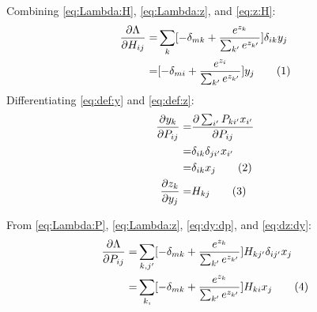 \documentclass[]{article}
\newcommand\numberthis{\addtocounter{equation}{1}\tag{\theequation}}
\begin{document}
Combining \eqref{eq:Lambda:H}, \eqref{eq:Lambda:z}, and \eqref{eq:z:H}:
\begin{align*}
	\frac{\partial{\Lambda}}{\partial H_{ij}} =& \sum_k  [-\delta_{mk} + \frac{e^{z_k}}{\sum_{k^{\prime}} e^{z_{k^{\prime}}}} ] \delta_{ik} y_j\\
	=& [-\delta_{mi} + \frac{e^{z_i}}{\sum_{k^{\prime}} e^{z_{k^{\prime}}}} ]  y_j   \numberthis \label{eq:Lambda:HH}
\end{align*}
Differentiating \eqref{eq:def:y} and \eqref{eq:def:z}:
\begin{align*}
	\frac{\partial y_k}{\partial P_{ij}} =&\frac{\partial \sum_{i^{\prime}} P_{k{i^{\prime}}} x_{i^{\prime}}}{\partial P_{ij}}\\
	=& \delta_{ik} \delta_{j{i^{\prime}}} x_{{i^{\prime}}}\\
	=& \delta_{ik} x_j \numberthis \label{eq:dy:dp}\\
	\frac{\partial z_k}{\partial y_j} =& H_{kj} \numberthis \label{eq:dz:dy}
\end{align*}

From \eqref{eq:Lambda:P}, \eqref{eq:Lambda:z}, \eqref{eq:dy:dp}, and \eqref{eq:dz:dy}:
\begin{align*}
	\frac{\partial{\Lambda}}{\partial P_{ij}} =&\sum_{k,j^{\prime}} [-\delta_{mk} + \frac{e^{z_k}}{\sum_{k^{\prime}} e^{z_{k^{\prime}}}}] H_{k{j^{\prime}}} \delta_{ij^{\prime}} x_j\\
	=&\sum_{k,} [-\delta_{mk} + \frac{e^{z_k}}{\sum_{k^{\prime}} e^{z_{k^{\prime}}}}] H_{ki}  x_j \numberthis \label{eq:Lambda:PP}
\end{align*}


\printglossaries




\end{document}

